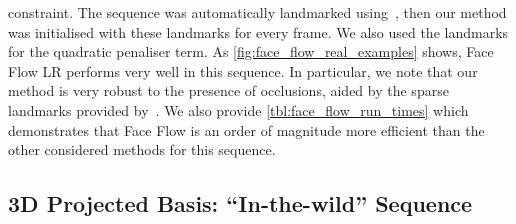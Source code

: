constraint. The sequence was
automatically landmarked using~\cite{kazemi2014one}, then our method was initialised with
these landmarks for every frame. We also used the landmarks for the quadratic penaliser term.
As \cref{fig:face_flow_real_examples} shows, Face Flow LR performs very well in this sequence. 
In particular, we note that our method is very robust to the presence of occlusions, 
aided by the sparse landmarks provided by~\cite{kazemi2014one}. 
We also provide \cref{tbl:face_flow_run_times}
which demonstrates that Face Flow is an order of magnitude more efficient than
the other considered methods for this sequence.
\subsection{3D Projected Basis: ``In-the-wild'' Sequence}\label{subsec:face_flow_experiments_boris}
